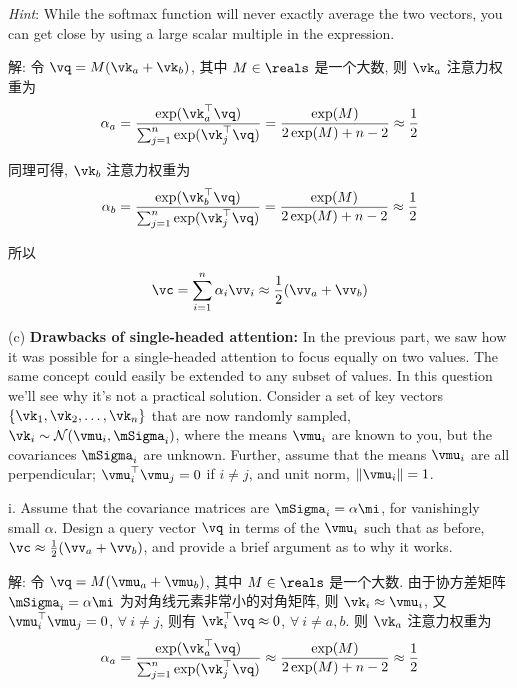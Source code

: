 \documentclass[openany]{ctexbook}
\theoremstyle{kaiti}
\theoremstyle{normal}
\begin{document}
\emph{Hint}: While the softmax function will never exactly average the two vectors, you can get close by using a large scalar multiple
in the expression.

解: 令 $\vq=M(\vk_a+\vk_b)$, 其中 $M\in\reals$ 是一个大数, 则 $\vk_a$ 注意力权重为
\begin{equation}
  \alpha_a
  =\frac{\exp(\vk_{a}^{\top}\vq)}{\sum_{j=1}^{n}\exp(\vk_{j}^{\top}\vq)}
  =\frac{\exp(M)}{2\exp(M)+n-2}
  \approx\frac{1}{2}
\end{equation}

同理可得, $\vk_b$ 注意力权重为
\begin{equation}
  \alpha_b
  =\frac{\exp(\vk_{b}^{\top}\vq)}{\sum_{j=1}^{n}\exp(\vk_{j}^{\top}\vq)}
  =\frac{\exp(M)}{2\exp(M)+n-2}
  \approx\frac{1}{2}
\end{equation}

所以
\begin{equation}
  \vc
  =\sum_{i=1}^{n}\alpha_{i}\vv_{i}
  \approx\frac{1}{2}(\vv_{a}+\vv_{b})
\end{equation}

(c) \textbf{Drawbacks of single-headed attention:} In the previous part, we saw how it was possible for a single-headed attention to focus equally on two values. The same concept could easily be extended to any subset of values. In this question we'll see why it's not a practical solution. Consider a set of key vectors $\{\vk_{1},\vk_2,\dots, \vk_{n}\}$ that are now randomly sampled, $\vk_{i}\sim\mathcal{N}(\vmu_{i}, \mSigma_{i}) $, where the means $\vmu_{i}$ are known to you, but the covariances $\mSigma_{i}$ are unknown. Further, assume that the means $\vmu_i$ are all perpendicular; $\vmu_{i}^{\top}\vmu_{j}=0$ if $i \neq j$, and unit norm, $\|\vmu_{i}\|=1$.

\quad i. Assume that the covariance matrices are $\mSigma_{i}=\alpha \mi$, for vanishingly small $\alpha$. Design a query vector $\vq$ in terms of the $\vmu_i$ such that as before, $\vc \approx\frac{1}{2}(\vv_{a}+\vv_{b})$, and provide a brief argument as to why it works.

解: 令 $\vq=M(\vmu_a+\vmu_b)$, 其中 $M\in\reals$ 是一个大数. 由于协方差矩阵 $\mSigma_{i}=\alpha \mi$ 为对角线元素非常小的对角矩阵, 则 $\vk_i\approx\vmu_i$, 又 $\vmu_{i}^{\top}\vmu_{j}=0$, $\forall~i\neq j$, 则有 $\vk_i^\top\vq\approx0$, $\forall~i\neq a,b$. 则 $\vk_a$ 注意力权重为
\begin{equation}
  \alpha_a
  =\frac{\exp(\vk_{a}^{\top}\vq)}{\sum_{j=1}^{n}\exp(\vk_{j}^{\top}\vq)}
  \approx\frac{\exp(M)}{2\exp(M)+n-2}
  \approx\frac{1}{2}
\end{equation}
\end{document}

